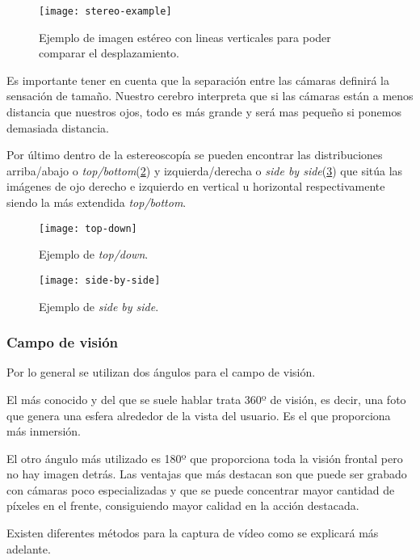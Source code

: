 \begin{figure}[H]
  \centering
  \texttt{[image: stereo-example]}
  \caption{Ejemplo de imagen estéreo con lineas verticales para poder comparar el desplazamiento.}
  \label{fig:stereo-example}
\end{figure}
\FloatBarrier

Es importante tener en cuenta que la separación entre las cámaras definirá la sensación de tamaño. Nuestro cerebro interpreta que si las cámaras están a menos distancia que nuestros ojos, todo es más grande y será mas pequeño si ponemos demasiada distancia.

Por último dentro de la estereoscopía se pueden encontrar las distribuciones arriba/abajo o \textit{top/bottom}(\ref{fig:top-bottom-example}) y izquierda/derecha o \textit{side by side}(\ref{fig:side-by-side-example}) que sitúa las imágenes de ojo derecho e izquierdo en vertical u horizontal respectivamente siendo la más extendida \textit{top/bottom}.

\begin{figure}[H]
  \centering
  \texttt{[image: top-down]}
  \caption{Ejemplo de \textit{top/down}.}
  \label{fig:top-bottom-example}
\end{figure}

\begin{figure}[H]
  \centering
  \texttt{[image: side-by-side]}
  \caption{Ejemplo de \textit{side by side}.}
  \label{fig:side-by-side-example}
\end{figure}
\FloatBarrier

\subsubsection{Campo de visión}
Por lo general se utilizan dos ángulos para el campo de visión. 

El más conocido y del que se suele hablar trata 360º de visión, es decir, una foto que genera una esfera alrededor de la vista del usuario. Es el que proporciona más inmersión.

El otro ángulo más utilizado es 180º que proporciona toda la visión frontal pero no hay imagen detrás. Las ventajas que más destacan son que puede ser grabado con cámaras poco especializadas y que se puede concentrar mayor cantidad de píxeles en el frente, consiguiendo mayor calidad en la acción destacada.

Existen diferentes métodos para la captura de vídeo como se explicará más adelante.

